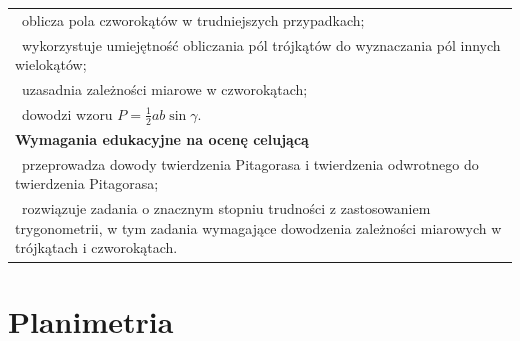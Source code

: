 \documentclass[12pt,a4paper]{article}
\begin{document}
\begin{longtable}{|p{16cm}|}
		\textbullet\ oblicza pola czworokątów w trudniejszych przypadkach; \\
		
		\textbullet\ wykorzystuje umiejętność obliczania pól trójkątów do wyznaczania pól innych wielokątów; \\
		
		\textbullet\ uzasadnia zależności miarowe w czworokątach; \\
		
		\textbullet\ dowodzi wzoru $P=\frac{1}{2}ab\sin\gamma$. \\ \hline
		
		\textbf{Wymagania edukacyjne na ocenę celującą} \\ \hline
		
		\textbullet\ przeprowadza dowody twierdzenia Pitagorasa i twierdzenia odwrotnego do twierdzenia Pitagorasa; \\
		
		\textbullet\ rozwiązuje zadania o znacznym stopniu trudności z zastosowaniem trygonometrii, w tym zadania wymagające dowodzenia zależności miarowych w trójkątach i czworokątach. \\ \hline
		
	\end{longtable}
	
	\section{Planimetria}
	
\end{document}
